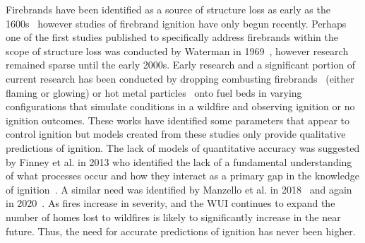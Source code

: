     
    Firebrands have been identified as a source of structure loss as early as the 1600s~\cite{Suzuki2020} however studies of firebrand ignition have only begun recently. Perhaps one of the first studies published to specifically address firebrands within the scope of structure loss was conducted by Waterman in 1969~\cite{Waterman1969ExperiemntalGeneration}, however research remained sparse until the early 2000s. Early research and a significant portion of current research has been conducted by dropping combusting firebrands~\cite{Ellis2011, Ellis2015, Ganteaume2009, Manzello2006, Manzello2006a} (either flaming or glowing) or hot metal particles~\cite{Wang2017, Urban2017, Fernandez-Pello2015, Hadden2011} onto fuel beds in varying configurations that simulate conditions in a wildfire and observing ignition or no ignition outcomes. These works have identified some parameters that appear to control ignition but models created from these studies only provide qualitative predictions of ignition. The lack of models of quantitative accuracy was suggested by Finney et al. in 2013 who identified the lack of a fundamental understanding of what processes occur and how they interact as a primary gap in the knowledge of ignition~\cite{Finney2013}. A similar need was identified by Manzello et al. in 2018~\cite{Manzello2018} and again in 2020~\cite{Manzello2020}. As fires increase in severity, and the WUI continues to expand the number of homes lost to wildfires is likely to significantly increase in the near future. Thus, the need for accurate predictions of ignition has never been higher. 
    
    
